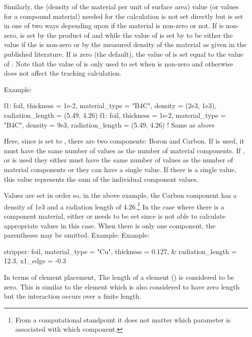 Similarly, the  (density of the material per unit of surface area) value (or
values for a compound material) needed for the calculation is not set directly but is set in one of
two ways depending upon if the material  is non-zero or not. If  is
non-zero,  is set by the product of  and  while
the value of  is set by \bmad to be either the value  if the
 is non-zero or by the measured density of the material as given in the published
literature. If  is zero (the default), the value of  is set
equal to the value of . Note that the value of  is only used to
set  when  is non-zero and otherwise does not affect the
tracking calculation.

Example:
\begin{example}
  f1: foil, thickness = 1e-2, material_type = "B4C", 
          density = (2e3, 1e3), radiation_length = (5.49, 4.26)
  f1: foil, thickness = 1e-2, material_type = "B4C", 
          density = 9e3, radiation_length = (5.49, 4.26)  ! Same as above
\end{example}
Here, since  is set to , there are two components: Boron and Carbon. If
 is used, it must have the same number of values as the number of material
components. If , or  is used they either must have the same number of
values as the number of material components or they can have a single value.  If there is a single
value, this value represents the sum of the individual component values.

Values are set in order so, in the above example, the
Carbon component has a density of 1e3 and a radiation length of 4.26.\footnote
  {
From a computational standpoint it does not matter which parameter is associated with which component.
  }
In the case where there is a component material, either  or  needs to
be set since \bmad is not able to calculate appropriate values in this case. When there is only one
component, the parentheses may be omitted. Example:
Example:
\begin{example}
  stripper: foil, material_type = "Cu", thickness = 0.127, &
                                  radiation_length = 12.3, x1_edge = -0.3
\end{example}

In terms of element placement, The length of a  element () is considered to be
zero.  This is similar to the  element which is also considered to have zero length but
the interaction occurs over a finite length.

